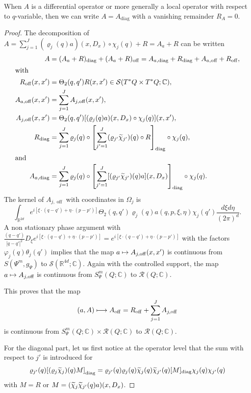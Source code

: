 \documentclass[AHL,Unicode,longabstracts]{cedram}
\newcommand{\C}{\mathbb{C}}
\newcommand{\R}{\mathbb{R}}
\newcommand{\clS}{\mathcal{S}}
\newcommand{\clR}{\mathcal{R}}
\DeclareMathOperator{\offf}{off}
\DeclareMathOperator{\diag}{diag}
\let\oldtilde\tilde
\renewcommand*{\tilde}[1]{\mathchoice{\widetilde{#1}}{\widetilde{#1}}{\oldtilde{#1}}{\oldtilde{#1}}}
\let\originalleft\left
\let\originalright\right
\renewcommand{\left}{\mathopen{}\mathclose\bgroup\originalleft}
\renewcommand{\right}{\aftergroup\egroup\originalright}
\let\oldmapsto\mapsto
\renewcommand*{\mapsto}{\mathchoice{\longmapsto}{\oldmapsto}{\oldmapsto}{\oldmapsto}}
\begin{document}
\begin{rema}\label{re:local}
When $A$ is a differential operator or more generally a local operator with respect to $q$-variable, then we can write $A=A_{\diag}$ with a vanishing remainder $R_A=0$.
\end{rema}
\begin{proof}
The decomposition of $A=\sum_{j=1}^{J}(\varrho_{j}(q)a)(x,D_{x})\circ \chi_{j}(q)+R=A_{a}+R$ can be written
\begin{align*}
A&=(A_{a}+R)_{\diag}+(A_{a}+R)_{\offf}=A_{a,\diag}+R_{\diag}+A_{a,\offf}+R_{\offf},\\
\intertext{with} R_{\offf}(x,x')&=\Theta_{2}(q,q')R(x,x')\in \clS(T^{*}Q\times T^{*}Q;\C),\\
 A_{a,\offf}(x,x')&=\sum_{j=1}^{J}A_{j,\offf}(x,x'),\\
 A_{j,\offf}(x,x')&=\Theta_{2}(q,q')[(\varrho_{j}(q)a)(x,D_{x})\circ \chi_{j}(q)](x,x'),\\
 R_{\diag}&=\sum_{j=1}^{J}\varrho_{j}(q) \circ \left[\sum_{j'=1}^{J}(\varrho_{j'}\tilde{\chi}_{j'})(q)\circ R\right]_{\diag}\circ \chi_{j}(q),\\
\intertext{and} A_{a,\diag}&=
\sum_{j=1}^{J}\varrho_{j}(q)\circ \left[\sum_{j'=1}^{J}[(\varrho_{j'}\tilde{\chi}_{j'})(q)a](x,D_{x})\right]_{\diag}\circ \chi_{j}(q).
\end{align*}
The kernel of $A_{j,\offf}$ with coordinates in $\Omega_{j}$ is
\[
\int_{\R^{2d}}e^{i[\xi\cdot(q-q')+\eta\cdot(p-p')]}\Theta_{2}(q,q')\varrho_{j}(q)a(q,p,\xi,\eta)\chi_{j}(q') \frac{d\xi d\eta}{(2\pi)^{d}}.
\]
A non stationary phase argument with $\frac{(q-q')}{|q-q'|^{2}}D_{\xi}e^{i[\xi\cdot(q-q')+\eta\cdot(p-p')]}=e^{i[\xi
\cdot(q-q')+\eta\cdot(p-p')]}$ with the factors $\varphi_{j}(q)\theta_{j}(q')$ implies that the map $a\mapsto A_{j,\offf}(x,x')$ is continuous from $S(\Psi^{m},g_{\Psi})$ to $\clS(\R^{4d};\C)$. Again with the controlled support, the map $a\mapsto A_{j,\offf}$ is continuous from $S^{m}_{\Psi}(Q;\C)$ to $\clR(Q;\C)$.

This proves that the map
\[
(a,A)\mapsto A_{\offf}=R_{\offf}+\sum_{j=1}^{J}A_{j,\offf}
\]
is continuous from $S^{m}_{\Psi}(Q;\C)\times \clR(Q;\C)$ to $\clR(Q;\C)$.

For the diagonal part, let us first notice at the operator level that the sum with respect to $j'$ is introduced for
\[
\varrho_{j'}(q)\left[(\varrho_{j}\tilde{\chi}_{j})(q)M\right]_{\diag} =\varrho_{j'}(q)\varrho_{j}(q)\tilde{\chi}_{j}(q)\tilde{\chi}_{j'}(q)[M]_{\diag}\chi_{j}(q)\chi_{j'}(q)
\]
with $M=R$ or $M=(\tilde{\chi}_{j}\tilde{\chi}_{j'}(q)a)(x,D_{x})$.


\end{proof}
\end{document}
